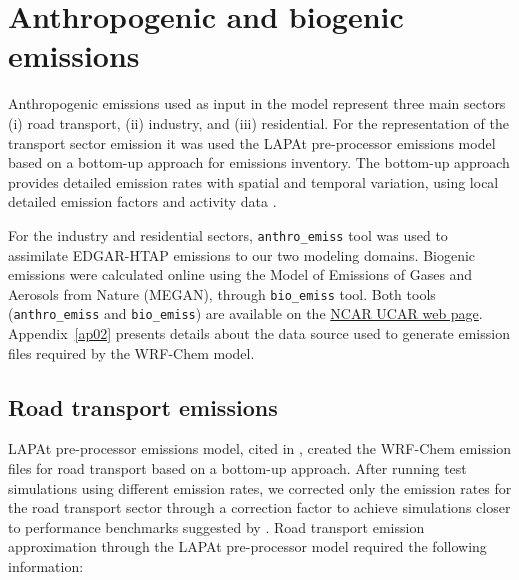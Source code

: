 	\section{Anthropogenic and biogenic emissions}
	Anthropogenic emissions used as input in the model represent three main sectors (i) road transport, (ii) industry, and (iii) residential.
	For the representation of the transport sector emission it was used the LAPAt pre-processor emissions model \citep{Andrade2015} based on a bottom-up approach for emissions inventory.
	The bottom-up approach provides detailed emission rates with spatial and temporal variation, using local detailed emission factors and activity data \citep{Wang2009}.
	
	For the industry and residential sectors, \verb|anthro_emiss| tool \citep{Kumar2020} was used to assimilate EDGAR-HTAP emissions to our two modeling domains.
	Biogenic emissions were calculated online using the Model of Emissions of Gases and Aerosols from Nature (MEGAN), through \verb|bio_emiss| tool.
	Both tools (\verb|anthro_emiss| and \verb|bio_emiss|) are available on the \href{https://www.acom.ucar.edu/wrf-chem/download.shtml}{NCAR UCAR web page}.
	Appendix~\ref{ap02} presents details about the data source used to generate emission files required by the WRF-Chem model.
	
		\subsection{Road transport emissions}
		LAPAt pre-processor emissions model, cited in \citet{Andrade2015}, created the WRF-Chem emission files for road transport based on a bottom-up approach.
		After running test simulations using different emission rates, we corrected only the emission rates for the road transport sector through a correction factor to achieve simulations closer to performance benchmarks suggested by \citet{Emery2017}.	
		Road transport emission approximation through the LAPAt pre-processor model required the following information:
		
